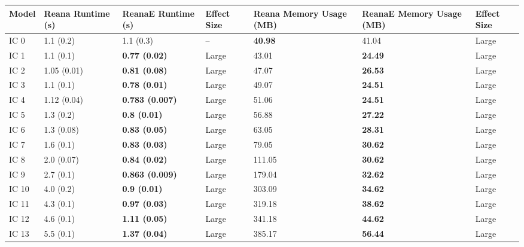 \begin{tabular}{lllllll}
\toprule
 Model & Reana Runtime (s) &      ReanaE Runtime (s) & Effect Size & Reana Memory Usage (MB) & ReanaE Memory Usage (MB) & Effect Size \\
\midrule
  IC 0 &         1.1 (0.2) &               1.1 (0.3) &          -- &          \textbf{40.98} &                    41.04 &       Large \\
  IC 1 &         1.1 (0.1) &    \textbf{0.77 (0.02)} &       Large &                   43.01 &           \textbf{24.49} &       Large \\
  IC 2 &       1.05 (0.01) &    \textbf{0.81 (0.08)} &       Large &                   47.07 &           \textbf{26.53} &       Large \\
  IC 3 &         1.1 (0.1) &    \textbf{0.78 (0.01)} &       Large &                   49.07 &           \textbf{24.51} &       Large \\
  IC 4 &       1.12 (0.04) &  \textbf{0.783 (0.007)} &       Large &                   51.06 &           \textbf{24.51} &       Large \\
  IC 5 &         1.3 (0.2) &     \textbf{0.8 (0.01)} &       Large &                   56.88 &           \textbf{27.22} &       Large \\
  IC 6 &        1.3 (0.08) &    \textbf{0.83 (0.05)} &       Large &                   63.05 &           \textbf{28.31} &       Large \\
  IC 7 &         1.6 (0.1) &    \textbf{0.83 (0.03)} &       Large &                   79.05 &           \textbf{30.62} &       Large \\
  IC 8 &        2.0 (0.07) &    \textbf{0.84 (0.02)} &       Large &                  111.05 &           \textbf{30.62} &       Large \\
  IC 9 &         2.7 (0.1) &  \textbf{0.863 (0.009)} &       Large &                  179.04 &           \textbf{32.62} &       Large \\
 IC 10 &         4.0 (0.2) &     \textbf{0.9 (0.01)} &       Large &                  303.09 &           \textbf{34.62} &       Large \\
 IC 11 &         4.3 (0.1) &    \textbf{0.97 (0.03)} &       Large &                  319.18 &           \textbf{38.62} &       Large \\
 IC 12 &         4.6 (0.1) &    \textbf{1.11 (0.05)} &       Large &                  341.18 &           \textbf{44.62} &       Large \\
 IC 13 &         5.5 (0.1) &    \textbf{1.37 (0.04)} &       Large &                  385.17 &           \textbf{56.44} &       Large \\

\end{tabular}
